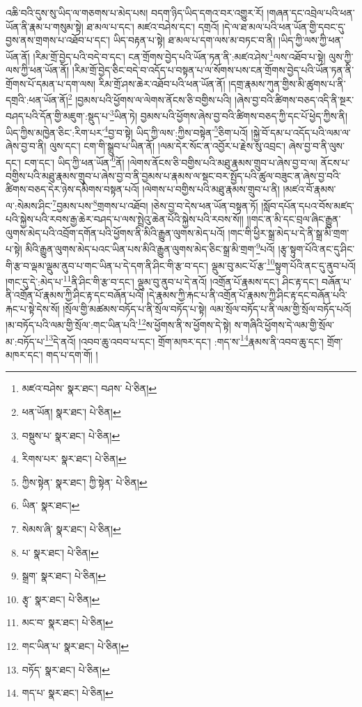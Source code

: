 འཆི་བའི་དུས་སུ་ཡིད་ལ་གཅགས་པ་མེད་པས། བདག་ཉིད་ཡིད་དགའ་བར་འགྱུར་རོ། །གཞན་དང་འབྲེལ་པའི་ཕན་ཡོན་ནི་རྣམ་པ་གསུམ་སྟེ། ཐ་མལ་པ་དང་། མཛའ་བཤེས་དང་། དགྲའོ། །དེ་ལ་ཐ་མལ་པའི་ཕན་ཡོན་གྱི་དབང་དུ་བྱས་ནས་གྲགས་པ་འཐོབ་པ་དང་། ཡིད་བརྟན་པ་སྟེ། ཐ་མལ་པ་དག་ལས་མ་བཏང་བ་ནི། །ཡིད་ཀྱི་ལས་ཀྱི་ཕན་ཡོན་ནོ། །རིམ་གྲོ་བྱེད་པའི་བདེ་བ་དང་། ངན་གྲོགས་བྱེད་པའི་ཡོན་ཏན་ནི་:མཛའ་ཤེས་\footnote{མཛའ་བཤེས་  སྣར་ཐང་། བཤས་  པེ་ཅིན། }ལས་འཐོབ་པ་སྟེ། ལུས་ཀྱི་ལས་ཀྱི་ཕན་ཡོན་ནོ། །རིམ་གྲོ་བྱེད་ཅིང་བདེ་བ་འདོད་པ་བསྟན་པ་ལ་སོགས་པས་ངན་གྲོགས་བྱེད་པའི་ཡོན་ཏན་ནི་གྲོགས་པོ་དམན་པ་དག་ལས། རིམ་གྲོ་ཤས་ཆེར་འཐོབ་པའི་ཕན་ཡོན་ནོ། །དགྲ་རྣམས་ཀུན་གྱིས་མི་ཚུགས་པ་ནི་དགྲའི་:ཕན་ཡོན་ནོ།\footnote{ཕན་ཡོན།  སྣར་ཐང་།  པེ་ཅིན། } །བྱམས་པའི་ཕྱོགས་ལ་ལེགས་ནོངས་ཅི་བགྱིས་པའི། །ཞེས་བྱ་བའི་ཚིགས་བཅད་འདི་ནི་སྔར་བཤད་པའི་དོན་གྱི་མཇུག་:སྡུད་པ་\footnote{བསྡུས་པ་  སྣར་ཐང་།  པེ་ཅིན། }ཡིན་ཏེ། བྱམས་པའི་ཕྱོགས་ཞེས་བྱ་བའི་ཚིགས་བཅད་ཀྱི་དང་པོ་ཕྱེད་ཀྱིས་ནི། ཡིད་ཀྱིས་མཁྱེན་ཅིང་:རིག་པར་\footnote{རིགས་པར་  སྣར་ཐང་།  པེ་ཅིན། }བྱ་བ་སྟེ། ཡིད་ཀྱི་ལས་:ཀྱིས་བསྟེན་\footnote{ཀྱིས་སྟེན་  སྣར་ཐང་། ཀྱི་སྟེན་  པེ་ཅིན། }ཅིག་པའོ། །སྐྱེ་བོ་དམ་པ་འདོད་པའི་ལམ་ལ་ཞེས་བྱ་བ་ནི། ལུས་དང་། ངག་གི་སྒྲུབ་པ་ཡིན་ནོ། །ལམ་དེར་སོང་ན་འབྱོར་པ་རྗེས་སུ་འབྲང་། ཞེས་བྱ་བ་ནི་ལུས་དང་། ངག་དང་། ཡིད་ཀྱི་ཕན་ཡོན་\footnote{ཡིན་  སྣར་ཐང་། }ནོ། །ལེགས་ནོངས་ཅི་བགྱིས་པའི་མཐུ་རྣམས་གྲུབ་པ་ཞེས་བྱ་བ་ལ། ནོངས་པ་བགྱིས་པའི་མཐུ་རྣམས་གྲུབ་པ་ཞེས་བྱ་བ་ནི་བྱམས་པ་རྣམས་ལ་སྡང་བར་སྤྱོད་པའི་ཚུལ་བཟུང་ན་ཞེས་བྱ་བའི་ཚིགས་བཅད་དེར་ཉེས་དམིགས་བསྟན་པའོ། །ལེགས་པ་བགྱིས་པའི་མཐུ་རྣམས་གྲུབ་པ་ནི། །མཛའ་བོ་རྣམས་ལ་:སེམས་ཤིང་\footnote{སེམས་ཞི་  སྣར་ཐང་།  པེ་ཅིན། }བྱམས་པས་\footnote{པ་  སྣར་ཐང་།  པེ་ཅིན། }གྲགས་པ་འཐོབ། །ཅེས་བྱ་བ་དེས་ཕན་ཡོན་བསྟན་ཏོ། །སློབ་དཔོན་དཔའ་བོས་མཛད་པའི་སྐྱེས་པའི་རབས་རྒྱ་ཆེར་བཤད་པ་ལས་སྤྲེའུ་ཆེན་པོའི་སྐྱེས་པའི་རབས་སོ།། །།གང་ན་མི་དང་བྲལ་ཞིང་རྒྱུན་ལུགས་མེད་པའི་འབྲོག་དགོན་པའི་ཕྱོགས་ནི་མིའི་རྒྱུན་ལུགས་མེད་པའོ། །གང་གི་ཕྱིར་སྒྲ་མེད་པ་དེ་ནི་སྒྲ་མི་གྲག་པ་སྟེ། མིའི་རྒྱུན་ལུགས་མེད་པའང་ཡིན་པས་མིའི་རྒྱུན་ལུགས་མེད་ཅིང་སྒྲ་མི་གྲག་\footnote{སྒྲག་  སྣར་ཐང་།  པེ་ཅིན། }པའོ། །རྩྭ་སྟུག་པོའི་ནང་དུ་ཤིང་གི་རྩ་བ་ལྡམ་ལྡུམ་ནུབ་པ་གང་ཡིན་པ་དེ་དག་ནི་ཤིང་གི་རྩ་བ་དང་། ལྡུམ་བུ་མང་པོ་རྩ་\footnote{རྩྭ་  སྣར་ཐང་།  པེ་ཅིན། }སྟུག་པོའི་ནང་དུ་ནུབ་པའོ། །གང་དུ་དེ་:མེད་པ་\footnote{མང་བ་  སྣར་ཐང་།  པེ་ཅིན། }ནི་ཤིང་གི་རྩ་བ་དང་། ལྡུམ་བུ་ནུབ་པ་དེ་ནའོ། །འགྲོན་པོ་རྣམས་དང་། ཤིང་རྟ་དང་། བཞོན་པ་ནི་འགྲོན་པོ་རྣམས་ཀྱི་ཤིང་རྟ་དང་བཞོན་པའོ། །དེ་རྣམས་ཀྱི་རྐང་པ་ནི་འགྲོན་པོ་རྣམས་ཀྱི་ཤིང་རྟ་དང་བཞོན་པའི་རྐང་པ་སྟེ་དེས་སོ། །སྲོལ་གྱི་མཚམས་བཏོད་པ་ནི་སྲོལ་བཏོད་པ་སྟེ། ལམ་སྲོལ་བཏོད་པ་ནི་ལམ་གྱི་སྲོལ་བཏོད་པའོ། །མ་བཏོད་པའི་ལམ་གྱི་སྲོལ་:གང་ཡིན་པའི་\footnote{གང་ཡིན་པ་  སྣར་ཐང་།  པེ་ཅིན། }ས་ཕྱོགས་ནི་ས་ཕྱོགས་དེ་སྟེ། ས་གཞིའི་ཕྱོགས་དེ་ལམ་གྱི་སྲོལ་མ་:བཏོད་པ་\footnote{བཏོད་  སྣར་ཐང་།  པེ་ཅིན། }དེ་ནའོ། །འབབ་ཆུ་འབབ་པ་དང་། གྲོག་མཁར་དང་། :གད་ས་\footnote{གད་པ་  སྣར་ཐང་།  པེ་ཅིན། }རྣམས་ནི་འབབ་ཆུ་དང་། གྲོག་མཁར་དང་། གད་པ་དག་གོ། །
